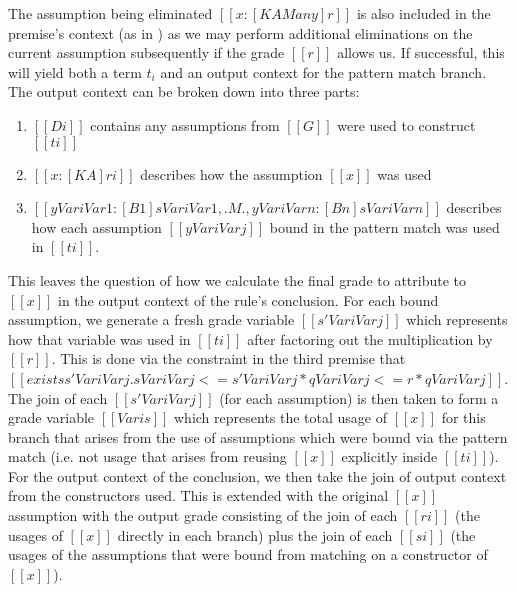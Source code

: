 The assumption being eliminated
$[[ x : [K {A Many}] r ]]$ is also included in the premise's context (as in \GRANULEdruleAppName) as we may perform
additional eliminations on the current assumption subsequently if the grade
$[[ r ]]$ allows us. If successful,
this will yield both a term $t_{i}$ and an output context for the
pattern match branch.
The output context can be broken down into three parts:
\begin{enumerate}
\item $[[ Di ]]$ contains any
assumptions from $[[ G ]]$ were used to construct $[[ ti ]]$
\item  $[[ x : [K A] ri ]]$ describes how the assumption $[[ x ]]$ was
used
\item $[[ {{y Vari Var1} : [B1] {s Vari Var1} } , .M. , {y Vari Varn} : [Bn] {s Vari Varn} ]]$ describes how each assumption  $[[ y Vari Varj ]]$ bound in the pattern
match was used in $[[ ti ]]$.
\end{enumerate}
%
This leaves the question of how we calculate the final grade to
attribute to $ [[ x ]]$  in the output context of the rule's conclusion.
For each bound assumption, we generate a fresh grade variable
$[[ s' Vari Varj  ]]$ which represents how that variable was used in $[[ ti ]]$
after factoring out the multiplication by $[[ r ]]$. This is done via the
constraint in the third premise that $ [[
exists {s' Vari Varj} . {s Vari Varj} <= {s' Vari Varj} * {q Vari Varj} <= r * {q Vari Varj} ]]$.
The join of each $[[ s' Vari Varj ]]$ (for each assumption) is then taken to
form a grade variable $[[ Vari s ]]$ which represents the total usage of
$[[ x ]]$ for this branch that arises from the use of assumptions which were
bound via the pattern match (i.e. not usage that arises from reusing $[[x]]$
explicitly inside $[[ ti ]]$). For the output context of the conclusion, we then
take the join of output context from the constructors used. This is extended
with the original $[[ x ]]$ assumption with the output grade consisting of the
join of each $[[ ri ]]$ (the usages of $[[ x ]]$ directly in each branch) plus
the join of each $[[ si ]]$ (the usages of the assumptions that were bound from
matching on a constructor of $[[ x ]]$).

